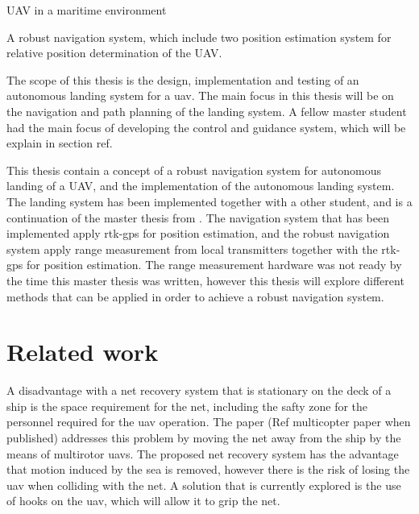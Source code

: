 UAV in a maritime environment

A robust navigation system, which include two position estimation system for relative position determination of the UAV. 

The scope of this thesis is the design, implementation and testing of an autonomous landing system for a uav. The main focus in this thesis will be on the navigation and path planning of the landing system. A fellow master student had the main focus of developing the control and guidance system, which will be explain in section ref.


This thesis contain a concept of a robust navigation system for autonomous landing of a UAV, and the implementation of the autonomous landing system. The landing system has been implemented together with a other student, and is a continuation of the master thesis from \citep{Froelich}. The navigation system that has been implemented apply rtk-gps for position estimation, and the robust navigation system apply range measurement from local transmitters together with the rtk-gps for position estimation. The range measurement hardware was not ready by the time this master thesis was written, however this thesis will explore different methods that can be applied in order to achieve a robust navigation system.



\section{Related work}
A disadvantage with a net recovery system that is stationary on the deck of a ship is the space requirement for the net, including the safty zone for the personnel required for the uav operation. The paper (Ref multicopter paper when published) addresses this problem by moving the net away from the ship by the means of multirotor uavs. The proposed net recovery system has the advantage that motion induced by the sea is removed, however there is the risk of losing the uav when colliding with the net. A solution that is currently explored is the use of hooks on the uav, which will allow it to grip the net.

